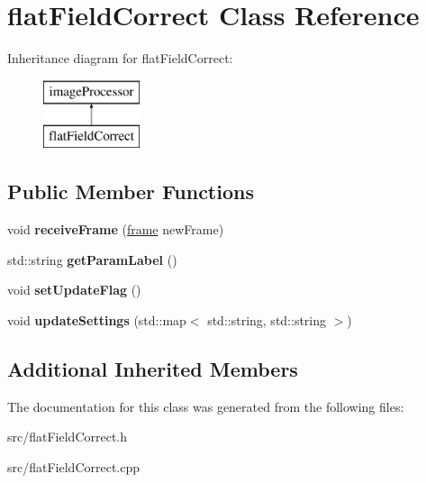 \hypertarget{classflat_field_correct}{}\section{flat\+Field\+Correct Class Reference}
\label{classflat_field_correct}
Inheritance diagram for flat\+Field\+Correct\+:\begin{figure}[H]
\begin{center}
\leavevmode
\includegraphics[height=2.000000cm]{classflat_field_correct}
\end{center}
\end{figure}
\subsection*{Public Member Functions}
\begin{DoxyCompactItemize}
\item 
void {\bfseries receive\+Frame} (\hyperlink{classframe}{frame} new\+Frame)\hypertarget{classflat_field_correct_abb93298ce9ede8bf7dec9ab69acf5555}{}\label{classflat_field_correct_abb93298ce9ede8bf7dec9ab69acf5555}

\item 
std\+::string {\bfseries get\+Param\+Label} ()\hypertarget{classflat_field_correct_a263a8f8f9c0172aa0eed261499510b08}{}\label{classflat_field_correct_a263a8f8f9c0172aa0eed261499510b08}

\item 
void {\bfseries set\+Update\+Flag} ()\hypertarget{classflat_field_correct_a09b0dae1b7251e184b6660655d3b9931}{}\label{classflat_field_correct_a09b0dae1b7251e184b6660655d3b9931}

\item 
void {\bfseries update\+Settings} (std\+::map$<$ std\+::string, std\+::string $>$)\hypertarget{classflat_field_correct_ab6fba6e38ffb4a8f5a9290715afe9b6d}{}\label{classflat_field_correct_ab6fba6e38ffb4a8f5a9290715afe9b6d}

\end{DoxyCompactItemize}
\subsection*{Additional Inherited Members}


The documentation for this class was generated from the following files\+:\begin{DoxyCompactItemize}
\item 
src/flat\+Field\+Correct.\+h\item 
src/flat\+Field\+Correct.\+cpp\end{DoxyCompactItemize}
